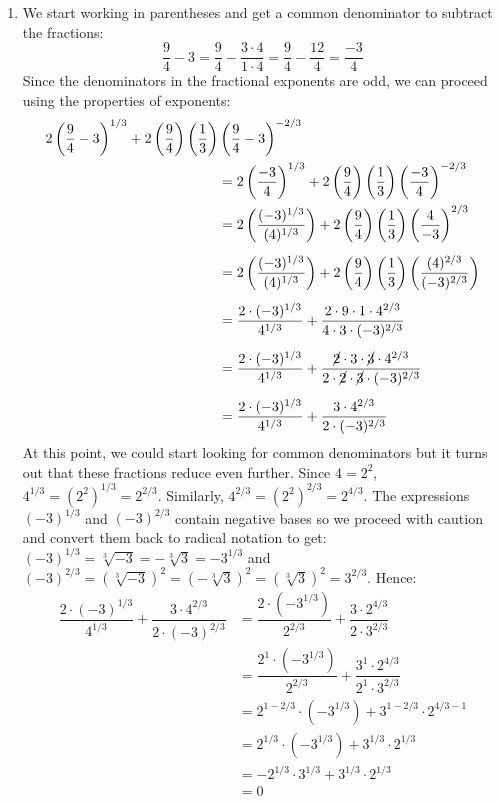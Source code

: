 {\begin{enumerate}
\drawexampleline

\item  We start working in parentheses and get a common denominator to subtract the fractions:
\[ 
\dfrac{9}{4} - 3 = \dfrac{9}{4} - \dfrac{3 \cdot 4}{1 \cdot 4} = \dfrac{9}{4} - \dfrac{12}{4} = \dfrac{-3}{4}  
\] 
Since the denominators in the fractional exponents are odd, we can proceed using the properties of exponents:
\begin{align*}
2 \left(\dfrac{9}{4} - 3\right)^{1/3} + 2\left(\dfrac{9}{4}\right)\left(\dfrac{1}{3}\right)&\left(\dfrac{9}{4}-3\right)^{-2/3}  \\
&= 2 \left(\dfrac{-3}{4} \right)^{1/3} + 2\left(\dfrac{9}{4}\right)\left(\dfrac{1}{3}\right)\left(\dfrac{-3}{4}\right)^{-2/3}  \\ 
& =  2 \left(\dfrac{(-3)^{1/3}}{(4)^{1/3}} \right) + 2\left(\dfrac{9}{4}\right)\left(\dfrac{1}{3}\right)\left(\dfrac{4}{-3}\right)^{2/3}  \\[5pt] 
& =  2 \left(\dfrac{(-3)^{1/3}}{(4)^{1/3}} \right) + 2\left(\dfrac{9}{4}\right)\left(\dfrac{1}{3}\right)\left(\dfrac{(4)^{2/3}}{(-3)^{2/3}}\right)\\[5pt] 
& =  \dfrac{2 \cdot (-3)^{1/3}}{4^{1/3}} + \dfrac{2 \cdot 9 \cdot 1 \cdot 4^{2/3}}{4 \cdot 3 \cdot (-3)^{2/3}}  \\[5pt]
& = \dfrac{2 \cdot (-3)^{1/3}}{4^{1/3}} + \dfrac{\cancel{2} \cdot 3 \cdot \cancel{3} \cdot 4^{2/3}}{2 \cdot \cancel{2} \cdot \cancel{3} \cdot (-3)^{2/3}} \\[5pt] 
& =  \dfrac{2 \cdot (-3)^{1/3}}{4^{1/3}} + \dfrac{3 \cdot 4^{2/3}}{2 \cdot (-3)^{2/3}} 
\end{align*}
At this point, we could start looking for common denominators but it turns out that these fractions reduce even further.  Since $4 = 2^2$, $4^{1/3} = (2^2)^{1/3} = 2^{2/3}$.  Similarly, $4^{2/3} = (2^2)^{2/3} = 2^{4/3}$. The expressions $(-3)^{1/3}$ and $(-3)^{2/3}$ contain negative bases so we proceed with caution and convert them back to radical notation to get:  $(-3)^{1/3} = \sqrt[3]{-3} = -\sqrt[3]{3} = - 3^{1/3}$ and  $(-3)^{2/3} = (\sqrt[3]{-3})^2 = (-\sqrt[3]{3})^2 =(\sqrt[3]{3})^2 = 3^{2/3}$.  Hence:
\begin{align*}
\dfrac{2 \cdot (-3)^{1/3}}{4^{1/3}} + \dfrac{3 \cdot 4^{2/3}}{2 \cdot (-3)^{2/3}} & =  \dfrac{2 \cdot (-3^{1/3})}{2^{2/3}} + \dfrac{3 \cdot 2^{4/3}}{2 \cdot 3^{2/3}}  \\
& =  \dfrac{2^{1} \cdot (-3^{1/3})}{2^{2/3}} + \dfrac{3^{1} \cdot 2^{4/3}}{2^{1} \cdot 3^{2/3}}   \\[5pt]
& =  2^{1 - 2/3} \cdot (-3^{1/3}) +3^{1- 2/3} \cdot 2^{4/3 - 1}   \\
& =  2^{1/3} \cdot (-3^{1/3}) +3^{1/3} \cdot 2^{1/3}   \\
& =   - 2^{1/3} \cdot 3^{1/3} +3^{1/3} \cdot 2^{1/3}   \\
& =  0 
\end{align*}
\end{enumerate}
}

